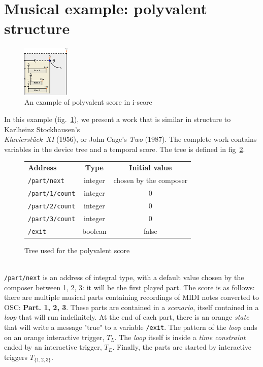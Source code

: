 \documentclass{article}
\newcommand{\scenario}{\textit{scenario}\xspace}
\newcommand{\Loop}{\textit{loop}\xspace}
\newcommand{\state}{\textit{state}\xspace}
\newcommand{\timeconstraint}{\textit{time constraint}\xspace}
\begin{document}
\section{Musical example: polyvalent structure}
\begin{figure}[h]
    \centering
    \includegraphics[width=0.20\textwidth]{images/partition.eps}
    \caption{An example of polyvalent score in i-score}
    \label{fig.polyvalent}
\end{figure}
In this example (fig.~\ref{fig.polyvalent}), we present a work that is similar in structure to Karlheinz Stockhausen's~\\ \emph{Klavierstück~XI} (1956), or John Cage's \emph{Two} (1987). 
The complete work contains variables in the device tree and a temporal score.
The tree is defined in fig~\ref{fig.tablescore}.
\begin{figure}[h]
	\small
    \begin{tabular}{lcc}        
        \textbf{Address} & \textbf{Type} & \textbf{Initial value} \\
        \lstinline|/part/next|    & integer & chosen by the composer \\
        \lstinline|/part/1/count| & integer & 0 \\
        \lstinline|/part/2/count| & integer & 0 \\
        \lstinline|/part/3/count| & integer & 0 \\
        \lstinline|/exit|         & boolean & false
    \end{tabular}
    \caption{Tree used for the polyvalent score}
    \label{fig.tablescore}
\end{figure}~\\
\lstinline{/part/next} is an address of integral type, with a default value chosen by the composer between 1, 2, 3: it will be the first played part. 
The score is as follows: there are multiple musical parts containing recordings of MIDI notes converted to OSC: \textbf{Part. 1, 2, 3}.
These parts are contained in a \scenario, itself contained in a \Loop that will run indefinitely. 
At the end of each part, there is an orange \state that will write a message "true" to a variable \lstinline{/exit}.
The pattern of the \Loop ends on an orange interactive trigger, $T_{L}$.
The \Loop itself is inside a \timeconstraint ended by an interactive trigger, $T_{E}$.
Finally, the parts are started by interactive triggers  $T_{\{1, 2, 3\}}$.
 
\end{document}
